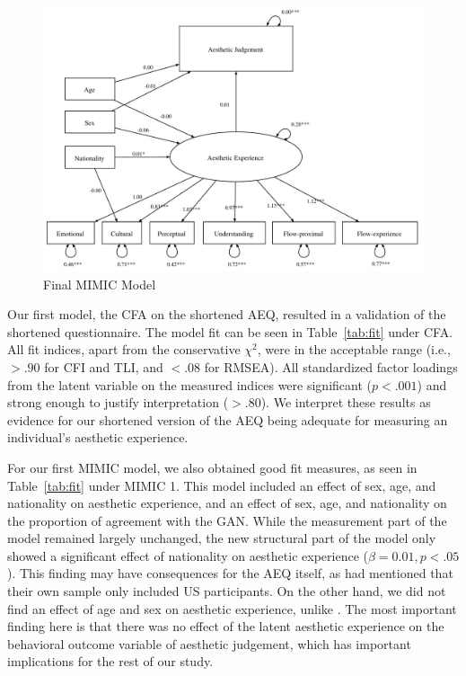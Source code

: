 \documentclass[../main.tex]{subfiles}
\begin{document}
\begin{figure}[!tb]
	\caption{Final MIMIC Model}
	\label{fig:finalmodel}
	\includegraphics[width=1\linewidth]{images/model3.pdf}
\end{figure}


Our first model, the CFA on the shortened AEQ, resulted in a validation of the shortened questionnaire. The model fit can be seen in Table~\ref{tab:fit} under CFA. All fit indices, apart from the conservative $\chi^{2}$, were in the acceptable range (i.e., $>.90$ for CFI and TLI, and $<.08$ for RMSEA). All standardized factor loadings from the latent variable on the measured indices were significant ($p<.001$) and strong enough to justify interpretation ($>.80$). We interpret these results as evidence for our shortened version of the AEQ being adequate for measuring an individual's aesthetic experience.

For our first MIMIC model, we also obtained good fit measures, as seen in Table~\ref{tab:fit} under MIMIC 1. This model included an effect of sex, age, and nationality on aesthetic experience, and an effect of sex, age, and nationality on the proportion of agreement with the GAN. While the measurement part of the model remained largely unchanged, the new structural part of the model only showed a significant effect of nationality on aesthetic experience ($\beta = 0.01, p<.05$). This finding may have consequences for the AEQ itself, as \textcite{wanzerExperiencingFlowViewing2020} had mentioned that their own sample only included US participants. On the other hand, we did not find an effect of age and sex on aesthetic experience, unlike \textcite{wanzerExperiencingFlowViewing2020}. The most important finding here is that there was no effect of the latent aesthetic experience on the behavioral outcome variable of aesthetic judgement, which has important implications for the rest of our study.
\end{document}
